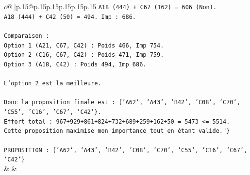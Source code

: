 \documentclass{article}
\begin{document}
{\begin{supertabular}{c@{$\;$}|p{.15\linewidth}@{}p{.15\linewidth}p{.15\linewidth}p{.15\linewidth}p{.15\linewidth}p{.15\linewidth}}
{{{\texttt{A18 (444) + C67 (162) = 606 (Non).} \\
\texttt{A18 (444) + C42 (50) = 494. Imp : 686.} \\
\\ 
\texttt{Comparaison :} \\
\texttt{Option 1 (A21, C67, C42) : Poids 466, Imp 754.} \\
\texttt{Option 2 (C16, C67, C42) : Poids 471, Imp 759.} \\
\texttt{Option 3 (A18, C42) : Poids 494, Imp 686.} \\
\\ 
\texttt{L'option 2 est la meilleure.} \\
\\ 
\texttt{Donc la proposition finale est : \{'A62', 'A43', 'B42', 'C08', 'C70', 'C55', 'C16', 'C67', 'C42'\}.} \\
\texttt{Effort total : 967+929+861+824+732+689+259+162+50 = 5473 <= 5514.} \\
\texttt{Cette proposition maximise mon importance tout en étant valide."\}} \\
\\ 
\texttt{PROPOSITION : \{'A62', 'A43', 'B42', 'C08', 'C70', 'C55', 'C16', 'C67', 'C42'\}} \\
            }
        }
    }
    & & \\ \\


\end{supertabular}}
\end{document}
